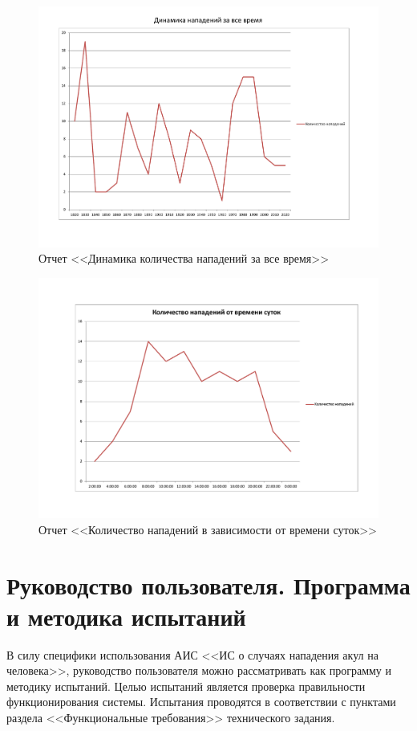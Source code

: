 \documentclass[russian,utf8,simple,emptystyle]{eskdtext}
\begin{document}
\begin{figure}[ht]
\centering
\includegraphics[width=\textwidth, angle=90]{report4}
\caption{Отчет <<Динамика количества нападений за все время>>}
\end{figure}

\begin{figure}[ht]
\centering
\includegraphics[width=\textwidth, angle=90]{report5}
\caption{Отчет <<Количество нападений в зависимости от времени суток>>}
\end{figure}

\clearpage
\section{Руководство пользователя. Программа и методика испытаний}
В силу специфики использования АИС <<ИС о случаях нападения акул на человека>>, руководство пользователя можно рассматривать как программу и методику испытаний. Целью испытаний является проверка правильности функционирования системы. Испытания проводятся в соответствии с пунктами раздела <<Функциональные требования>> технического задания.
\end{document}
